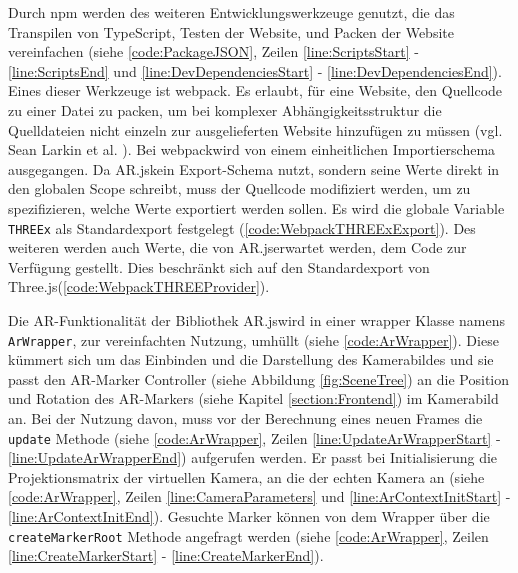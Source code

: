 Durch npm werden des weiteren Entwicklungswerkzeuge genutzt, die das
Transpilen von TypeScript, Testen der Website, und Packen der Website
vereinfachen (siehe \lstlistingname\space \ref{code:PackageJSON}, Zeilen
\ref{line:ScriptsStart} - \ref{line:ScriptsEnd} und
\ref{line:DevDependenciesStart} - \ref{line:DevDependenciesEnd}).
Eines dieser Werkzeuge ist \grqq webpack\grqq . Es erlaubt, für eine
Website, den Quellcode zu einer Datei zu packen, um bei komplexer
Abhängigkeitsstruktur die Quelldateien nicht einzeln zur
ausgelieferten Website hinzufügen zu müssen (vgl. Sean Larkin et al. \cite{Webpack}).
Bei \grqq webpack\grqq\space wird von einem einheitlichen Importierschema
ausgegangen. Da \grqq AR.js\grqq\space kein Export-Schema nutzt, sondern
seine Werte direkt in den globalen Scope schreibt, muss der Quellcode
modifiziert werden, um zu spezifizieren, welche Werte exportiert werden
sollen. Es wird die globale Variable \texttt{THREEx} als Standardexport
festgelegt (\lstlistingname\space \ref{code:WebpackTHREExExport}). Des weiteren werden
auch Werte, die von \grqq AR.js\grqq\space erwartet werden, dem Code
zur Verfügung gestellt. Dies beschränkt sich auf den Standardexport von
\grqq Three.js\grqq\space (\lstlistingname\space \ref{code:WebpackTHREEProvider}).

\bigskip



\bigskip



Die AR-Funktionalität der Bibliothek \grqq AR.js\grqq\space wird in einer
wrapper Klasse namens \texttt{ArWrapper}, zur vereinfachten Nutzung,
umhüllt (siehe \lstlistingname\space \ref{code:ArWrapper}).
Diese kümmert sich um das Einbinden und die Darstellung des Kamerabildes
und sie passt den \grqq AR-Marker Controller\grqq\space
(siehe Abbildung \ref{fig:SceneTree}) an die Position und Rotation des
AR-Markers (siehe Kapitel \ref{section:Frontend}) im Kamerabild an.
Bei der Nutzung davon, muss vor der Berechnung eines neuen Frames
die \texttt{update} Methode (siehe \lstlistingname\space \ref{code:ArWrapper},
Zeilen \ref{line:UpdateArWrapperStart} - \ref{line:UpdateArWrapperEnd})
aufgerufen werden. Er passt bei Initialisierung die Projektionsmatrix der
virtuellen Kamera, an die der echten Kamera an (siehe \lstlistingname\space
\ref{code:ArWrapper}, Zeilen \ref{line:CameraParameters} und
\ref{line:ArContextInitStart} - \ref{line:ArContextInitEnd}).
Gesuchte Marker können von dem Wrapper über die \texttt{createMarkerRoot}
Methode angefragt werden (siehe \lstlistingname\space
\ref{code:ArWrapper}, Zeilen \ref{line:CreateMarkerStart} -
\ref{line:CreateMarkerEnd}).

